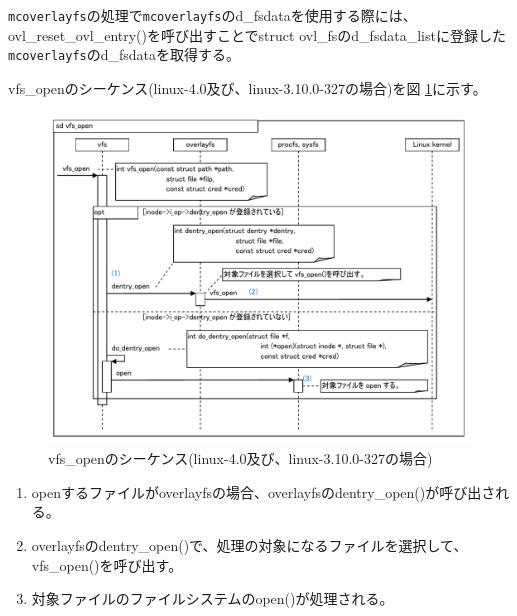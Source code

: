 \documentclass[twoside,11pt,fleqn]{book}
\begin{document}
{\texttt{mcoverlayfs}の処理で\texttt{mcoverlayfs}のd\_fsdataを使用する際には、ovl\_reset\_ovl\_entry()を呼び出すことでstruct ovl\_fsのd\_fsdata\_listに登録した\texttt{mcoverlayfs}のd\_fsdataを取得する。

vfs\_openのシーケンス(linux-4.0及び、linux-3.10.0-327の場合)を図 \ref{figure:chap05_fig002}に示す。
\begin{figure}[ht]
  \includegraphics[scale=0.85]{figs/chap05_fig002.pdf}
  \caption{vfs\_openのシーケンス(linux-4.0及び、linux-3.10.0-327の場合)}
  \label{figure:chap05_fig002}
\end{figure}

\begin{enumerate}
  \item openするファイルがoverlayfsの場合、overlayfsのdentry\_open()が呼び出される。
  \item overlayfsのdentry\_open()で、処理の対象になるファイルを選択して、vfs\_open()を呼び出す。
  \item 対象ファイルのファイルシステムのopen()が処理される。
\end{enumerate}

}
\end{document}
